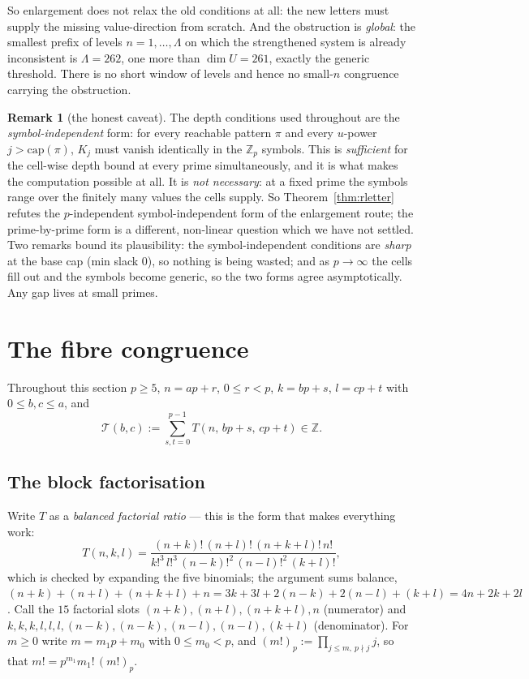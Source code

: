 \documentclass[11pt,reqno]{amsart}
\theoremstyle{plain}
\theoremstyle{definition}
\newtheorem{remark}[theorem]{Remark}
\theoremstyle{remark}
\numberwithin{equation}{section}
\newcommand{\ZZ}{\mathbb{Z}}
\newcommand{\Zp}{\ZZ_p}
\newcommand{\Tcal}{\mathcal{T}}
\begin{document}
So enlargement does not relax the old conditions at all: the new letters must supply the
missing value-direction from scratch. And the obstruction is \emph{global}: the smallest prefix
of levels $n=1,\dots,\Lambda$ on which the strengthened system is already inconsistent is
$\Lambda=262$, one more than $\dim U=261$, exactly the generic threshold. There is no short
window of levels and hence no small-$n$ congruence carrying the obstruction.

\begin{remark}[the honest caveat]\label{rem:honest}
The depth conditions used throughout are the \emph{symbol-independent} form: for every
reachable pattern $\pi$ and every $u$-power $j>\mathrm{cap}(\pi)$, $K_j$ must vanish
identically in the $\Zp$ symbols. This is \emph{sufficient} for the cell-wise depth bound at
every prime simultaneously, and it is what makes the computation possible at all. It is
\emph{not necessary}: at a fixed prime the symbols range over the finitely many values the
cells supply. So Theorem~\ref{thm:rletter} refutes the $p$-independent symbol-independent form
of the enlargement route; the prime-by-prime form is a different, non-linear question which we
have not settled. Two remarks bound its plausibility: the symbol-independent conditions are
\emph{sharp} at the base cap (min slack $0$), so nothing is being wasted; and as $p\to\infty$
the cells fill out and the symbols become generic, so the two forms agree asymptotically. Any
gap lives at small primes.
\end{remark}

\section{The fibre congruence}\label{sec:F}

Throughout this section $p\ge5$, $n=ap+r$, $0\le r<p$, $k=bp+s$, $l=cp+t$ with $0\le b,c\le a$,
and
\[
\Tcal(b,c):=\sum_{s,t=0}^{p-1}T(n,\,bp+s,\,cp+t)\in\ZZ .
\]

\subsection{The block factorisation}

Write $T$ as a \emph{balanced factorial ratio} --- this is the form that makes everything work:
\begin{equation}\label{eq:Tfact}
T(n,k,l)=\frac{(n+k)!\,(n+l)!\,(n+k+l)!\,n!}
{k!^3\,l!^3\,(n-k)!^2\,(n-l)!^2\,(k+l)!},
\end{equation}
which is checked by expanding the five binomials; the argument sums balance,
$(n+k)+(n+l)+(n+k+l)+n=3k+3l+2(n-k)+2(n-l)+(k+l)=4n+2k+2l$. Call the $15$ factorial slots
$(n+k),(n+l),(n+k+l),n$ (numerator) and $k,k,k,l,l,l,(n-k),(n-k),(n-l),(n-l),(k+l)$
(denominator). For $m\ge0$ write $m=m_1p+m_0$ with $0\le m_0<p$, and
$(m!)_p:=\prod_{j\le m,\ p\nmid j}j$, so that $m!=p^{m_1}m_1!\,(m!)_p$.
\end{document}
